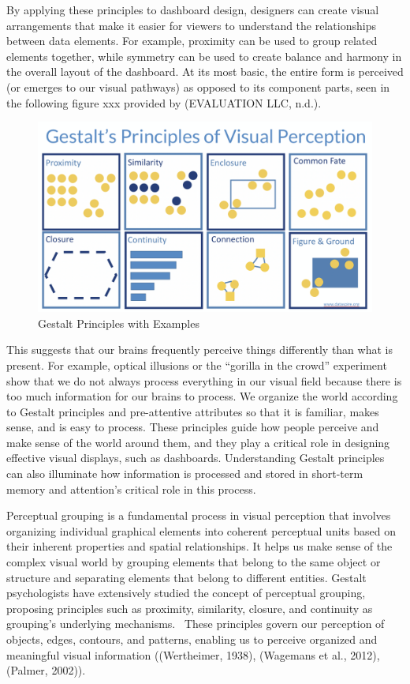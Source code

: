 \documentclass[print]{nuthesis}
\begin{document}
By applying these principles to dashboard design, designers can create visual arrangements that make it easier for viewers to understand the relationships between data elements.
For example, proximity can be used to group related elements together, while symmetry can be used to create balance and harmony in the overall layout of the dashboard.
At its most basic, the entire form is perceived (or emerges to our visual pathways) as opposed to its component parts, seen in the following figure xxx provided by (EVALUATION LLC, n.d.).

\begin{figure}

{\centering \includegraphics[width=0.75\linewidth]{figure/GestaltPrinciplesofVisualPerception} 

}

\caption{Gestalt Principles with Examples}\label{fig:gestalt}
\end{figure}

This suggests that our brains frequently perceive things differently than what is present.
For example, optical illusions or the ``gorilla in the crowd'' experiment show that we do not always process everything in our visual field because there is too much information for our brains to process.
We organize the world according to Gestalt principles and pre-attentive attributes so that it is familiar, makes sense, and is easy to process.
These principles guide how people perceive and make sense of the world around them, and they play a critical role in designing effective visual displays, such as dashboards.
Understanding Gestalt principles can also illuminate how information is processed and stored in short-term memory and attention's critical role in this process.

Perceptual grouping is a fundamental process in visual perception that involves organizing individual graphical elements into coherent perceptual units based on their inherent properties and spatial relationships.
It helps us make sense of the complex visual world by grouping elements that belong to the same object or structure and separating elements that belong to different entities. Gestalt psychologists have extensively studied the concept of perceptual grouping, proposing principles such as proximity, similarity, closure, and continuity as grouping's underlying mechanisms.~
These principles govern our perception of objects, edges, contours, and patterns, enabling us to perceive organized and meaningful visual information ((Wertheimer, 1938), (Wagemans et al., 2012), (Palmer, 2002)).
\end{document}
